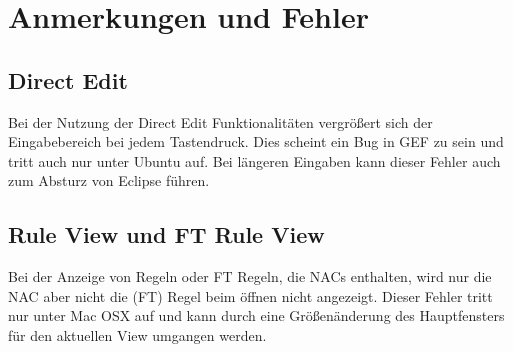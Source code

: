 \chapter{Anmerkungen und Fehler}


\section{Direct Edit}
Bei der Nutzung der Direct Edit  Funktionalitäten vergrößert sich der Eingabebereich bei jedem Tastendruck. Dies scheint ein Bug in GEF zu sein und tritt auch nur unter Ubuntu auf. Bei längeren Eingaben kann dieser Fehler auch zum Absturz von Eclipse führen.

\section{Rule View und FT Rule View}
Bei der Anzeige von Regeln oder FT Regeln, die NACs enthalten, wird nur die NAC aber nicht die (FT) Regel beim öffnen nicht angezeigt. Dieser Fehler tritt nur unter Mac OSX auf und kann durch eine Größenänderung des Hauptfensters für den aktuellen View umgangen werden.
